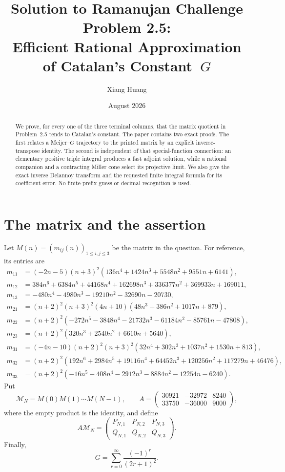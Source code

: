 \documentclass[11pt]{article}
\title{Solution to Ramanujan Challenge Problem 2.5:\\
Efficient Rational Approximation of Catalan's Constant~$G$}
\author{Xiang Huang}
\date{August 2026}
\theoremstyle{remark}
\begin{document}
\maketitle

\begin{abstract}
We prove, for every one of the three terminal columns, that the
matrix quotient in Problem~2.5 tends to Catalan's constant.  The
paper contains two exact proofs.  The first relates a Meijer--$G$
trajectory to the printed matrix by an explicit inverse-transpose
identity.  The second is independent of that special-function
connection: an elementary positive triple integral produces a fast
adjoint solution, while a rational companion and a contracting Miller
cone select its projective limit.  We also give the exact inverse
Delannoy transform and the requested finite integral formula for its
coefficient error.  No finite-prefix guess or decimal recognition is
used.
\end{abstract}

\section{The matrix and the assertion}

Let $M(n)=(m_{ij}(n))_{1\leq i,j\leq3}$ be the matrix in the
question.  For reference, its entries are
\begingroup\small
\begin{align*}
m_{11}&=(-2n-5)(n+3)^2(136n^4+1424n^3+5548n^2+9551n+6141),\\
m_{12}&=384n^6+6384n^5+44168n^4+162698n^3+336377n^2+369933n+169011,\\
m_{13}&=-480n^4-4980n^3-19210n^2-32690n-20730,\\
m_{21}&=(n+2)^2(n+3)^2(4n+10)(48n^3+386n^2+1017n+879),\\
m_{22}&=(n+2)^2(-272n^5-3848n^4-21732n^3-61184n^2-85761n-47808),\\
m_{23}&=(n+2)^2(320n^3+2540n^2+6610n+5640),\\
m_{31}&=(-4n-10)(n+2)^2(n+3)^2(32n^4+302n^3+1037n^2+1530n+813),\\
m_{32}&=(n+2)^2(192n^6+2984n^5+19116n^4+64452n^3+120256n^2+117279n+46476),\\
m_{33}&=(n+2)^2(-16n^5-408n^4-2912n^3-8884n^2-12254n-6240).
\end{align*}
\endgroup
Put
\[
 \mathcal M_N=M(0)M(1)\cdots M(N-1),\qquad
 A=\begin{pmatrix}30921&-32972&8240\\33750&-36000&9000\end{pmatrix},
\]
where the empty product is the identity, and define
\[
 A\mathcal M_N=
 \begin{pmatrix}P_{N,1}&P_{N,2}&P_{N,3}\\
                 Q_{N,1}&Q_{N,2}&Q_{N,3}\end{pmatrix}.
\]
Finally,
\[
 G=\sum_{r=0}^{\infty}\frac{(-1)^r}{(2r+1)^2}.
\]
\end{document}
